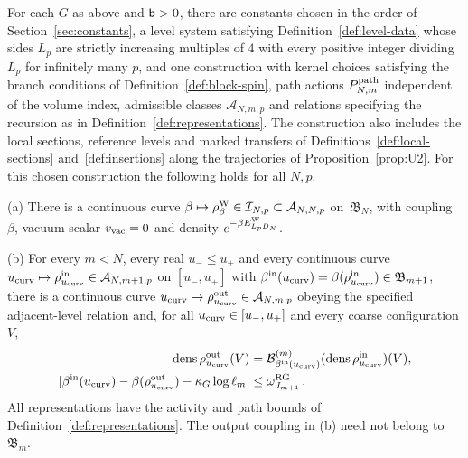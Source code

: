 \begin{proposition}\label{prop:U1}
For each $G$ as above and $\mathsf{b}>0$, there are constants chosen in the order of Section~\ref{sec:constants}, a level system satisfying Definition~\ref{def:level-data} whose sides $L_p$ are strictly increasing multiples of $4$ with every positive integer dividing $L_p$ for infinitely many $p$, and one construction with kernel choices satisfying the branch conditions of Definition~\ref{def:block-spin}, path actions $P^{\mathrm{path}}_{N,m}$ independent of the volume index, admissible classes $\mathcal A_{N,m,p}$ and relations specifying the recursion as in Definition~\ref{def:representations}. The construction also includes the local sections, reference levels and marked transfers of Definitions~\ref{def:local-sections} and~\ref{def:insertions} along the trajectories of Proposition~\ref{prop:U2}. For this chosen construction the following holds for all $N,p$.

(a) There is a continuous curve $\beta\mapsto\rho^{\rm W}_\beta\in\mathcal I_{N,p}\subset\mathcal A_{N,N,p}$ on~$\mathfrak B_N$, with coupling $\beta$, vacuum scalar $v_{\rm vac}=0$ and density $e^{-\beta E^{\rm W}_{L_pD_N}}$.

(b) For every $m<N$, every real $u_-\le u_+$ and every continuous curve $u_{\rm curv}\mapsto\rho^{\rm in}_{u_{\rm curv}}\in\mathcal A_{N,m+1,p}$ on $[u_-,u_+]$ with $\beta^{\rm in}(u_{\rm curv})=\beta(\rho^{\rm in}_{u_{\rm curv}})\in\mathfrak B_{m+1}$, there is a continuous curve $u_{\rm curv}\mapsto\rho^{\rm out}_{u_{\rm curv}}\in\mathcal A_{N,m,p}$ obeying the specified adjacent-level relation and, for all $u_{\rm curv}\in[u_-,u_+]$ and every coarse configuration $V$,
\begin{equation}\label{eq:U1-1}
\begin{aligned}
\operatorname{dens}\rho^{\rm out}_{u_{\rm curv}}(V)
&=\mathcal{B}^{(m)}_{\beta^{\rm in}(u_{\rm curv})}(\operatorname{dens}\rho^{\rm in}_{u_{\rm curv}})(V),\\
|\beta^{\rm in}(u_{\rm curv})-\beta(\rho^{\rm out}_{u_{\rm curv}})-\kappa_G\log\ell_m|
&\le\omega^{\rm RG}_{J_{m+1}}\,.
\end{aligned}
\end{equation}
All representations have the activity and path bounds of Definition~\ref{def:representations}. The output coupling in (b) need not belong to $\mathfrak B_m$.


\end{proposition}
